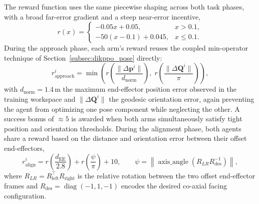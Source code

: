 The reward function uses the same piecewise shaping across both task phases, with a broad far-error
gradient and a steep near-error incentive,
\begin{equation}
r(x) =
\begin{cases}
-0.05 x + 0.05, & x > 0.1, \\
-50(x - 0.1) + 0.045, & x \leq 0.1.
\end{cases}
\label{eq:alpha_piecewise}
\end{equation}
During the approach phase, each arm's reward reuses the coupled min-operator technique of
Section~\ref{subsec:dikppo_pose} directly:
\begin{equation}
r_{\text{approach}}^i = \min\!\left( r\!\left( \frac{\lVert \Delta \mathbf{p}^i \rVert}{d_{\text{norm}}} \right),\;
r\!\left( \frac{\lVert \Delta \mathbf{Q}^i \rVert}{\pi} \right) \right),
\label{eq:alpha_approach}
\end{equation}
with $d_{\text{norm}} = 1.4$\,m the maximum end-effector position error observed in the training
workspace and $\lVert \Delta \mathbf{Q}^i \rVert$ the geodesic orientation error, again preventing
the agent from optimizing one pose component while neglecting the other. A success bonus of
$\approx 5$ is awarded when both arms simultaneously satisfy tight position and orientation
thresholds. During the alignment phase, both agents share a reward based on the distance and
orientation error between their offset end-effectors,
\begin{equation}
r_{\text{align}}^i = r\!\left( \frac{d_{\text{EE}}}{2.8} \right) + r\!\left( \frac{\psi}{\pi} \right) + 10,
\qquad \psi = \left\lVert \operatorname{axis\_angle}\!\left( R_{LR} R_{\text{des}}^{-1} \right) \right\rVert,
\label{eq:alpha_align}
\end{equation}
where $R_{LR} = R_{\text{left}}^\top R_{\text{right}}$ is the relative rotation between the two
offset end-effector frames and $R_{\text{des}} = \operatorname{diag}(-1, 1, -1)$ encodes the desired
co-axial facing configuration.

